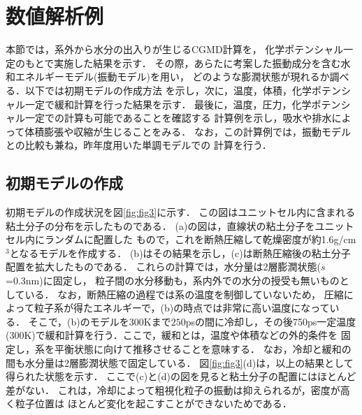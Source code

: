 \section{数値解析例}
本節では，系外から水分の出入りが生じるCGMD計算を，
化学ポテンシャル一定のもとで実施した結果を示す．
その際，あらたに考案した振動成分を含む水和エネルギーモデル(振動モデル)を用い，
どのような膨潤状態が現れるか調べる．以下では初期モデルの作成方法
を示し，次に，温度，体積，化学ポテンシャル一定で緩和計算を行った結果を示す．
最後に，温度，圧力，化学ポテンシャル一定での計算も可能であることを確認する
計算例を示し，吸水や排水によって体積膨張や収縮が生じることをみる．
なお，この計算例では，振動モデルとの比較も兼ね，昨年度用いた単調モデルでの
計算を行う．
\subsection{初期モデルの作成}
初期モデルの作成状況を図\ref{fig:fig3}に示す．
この図はユニットセル内に含まれる粘土分子の分布を示したものである．
(a)の図は，直線状の粘土分子をユニットセル内にランダムに配置した
もので，これを断熱圧縮して乾燥密度が約1.6g/cm$^{3}$となるモデルを作成する．
(b)はその結果を示し，(c)は断熱圧縮後の粘土分子配置を拡大したものである．
これらの計算では，水分量は2層膨潤状態($s$=0.3nm)に固定し，
粒子間の水分移動も，系内外での水分の授受も無いものとしている．
なお，断熱圧縮の過程では系の温度を制御していないため，
圧縮によって粒子系が得たエネルギーで，(b)の時点では非常に高い温度になっている．
そこで，(b)のモデルを300Kまで$250$psの間に冷却し，その後750ps一定温度
(300K)で緩和計算を行う．ここで，緩和とは，温度や体積などの外的条件を
固定し，系を平衡状態に向けて推移させることを意味する．
なお，冷却と緩和の間も水分量は2層膨潤状態で固定している．
図\ref{fig:fig3}(d)は，以上の結果として得られた状態を示す．
ここで(c)と(d)の図を見ると粘土分子の配置にはほとんど差がない．
これは，冷却によって粗視化粒子の振動は抑えられるが，密度が高く粒子位置は
ほとんど変化を起こすことができないためである．
